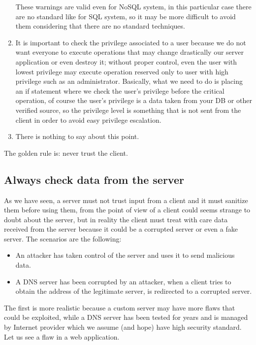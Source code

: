 \begin{enumerate}
	These warnings are valid even for NoSQL system, in this particular case there are no standard like for SQL system, so it may be more difficult to avoid them considering that there are no standard techniques.
	\item It is important to check the privilege associated to a user because we do not want everyone to execute operations that may change drastically our server application or even destroy it; without proper control, even the user with lowest privilege may execute operation reserved only to user with high privilege such as an administrator.
	Basically, what we need to do is placing an if statement where we check the user’s privilege before the critical operation, of course the user’s privilege is a data taken from your DB or other verified source, so the privilege level is something that is not sent from the client in order to avoid easy privilege escalation.
	\item There is nothing to say about this point.
\end{enumerate}

The golden rule is: never trust the client.

\subsection{Always check data from the server}
As we have seen, a server must not trust input from a client and it must sanitize them before using them, from the point of view of a client could seems strange to doubt about the server, but in reality the client must treat with care data received from the server because it could be a corrupted server or even a fake server.\newline
The scenarios are the following:
\begin{itemize}
	\item An attacker has taken control of the server and uses it to send malicious data.
	\item A DNS server has been corrupted by an attacker, when a client tries to obtain the address of the legitimate server, is redirected to
	a corrupted server.
\end{itemize}

The first is more realistic because a custom server may have more flaws that could be exploited, while a DNS server has been tested for years and is managed by Internet provider which we assume (and hope) have high security standard.\newline
Let us see a flaw in a web application.

